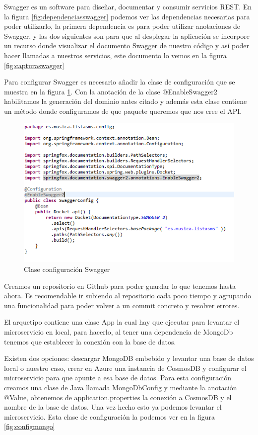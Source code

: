\documentclass[12pt]{report} %
\begin{document}
Swagger es un software para diseñar, documentar y consumir servicios REST. En la figura \ref{fig:dependenciasswagger} podemos ver las dependencias necesarias para poder utilizarlo, la primera dependencia es para poder utilizar anotaciones de Swagger, y las dos siguientes son para que al desplegar la aplicación se incorpore un recurso donde visualizar el documento Swagger de nuestro código y así poder hacer llamadas a nuestros servicios, este documento lo vemos en la figura \ref{fig:capturaswagger}

Para configurar Swagger es necesario añadir la clase de configuración que se muestra en la figura \ref{fig:cofingswagger}. Con la anotación de la clase @EnableSwagger2 habilitamos la generación del dominio antes citado y además esta clase contiene un método donde configuramos de que paquete queremos que nos cree el API.

\begin{figure}
	\centering
	\includegraphics[width=0.7\linewidth]{imagenes/cofingSwagger}
	\caption{Clase configuración Swagger}
	\label{fig:cofingswagger}
\end{figure}


Creamos un repositorio en Github \cite{repositorio} para poder guardar lo que tenemos hasta ahora. Es recomendable ir subiendo al repositorio cada poco tiempo y agrupando una funcionalidad para poder volver a un commit concreto y resolver errores.

El arquetipo contiene una clase App la cual hay que ejecutar para levantar el microservicio en local, para hacerlo, al tener una dependencia de MongoDb tenemos que establecer la conexión con la base de datos.

Existen dos opciones: descargar MongoDB embebido y levantar una base de datos local o nuestro caso, crear en Azure una instancia de CosmosDB y configurar el microservicio para que apunte a esa base de datos. Para esta configuración creamos una clase de Java llamada MongoDbConfig y mediante la anotación @Value, obtenemos de application.properties la conexión a CosmosDB y el nombre de la base de datos. Una vez hecho esto ya podemos levantar el microservicio. Esta clase de configuración la podemos ver en la figura \ref{fig:configmongo}
\end{document}
